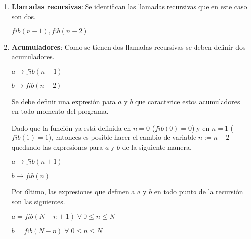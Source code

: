 \documentclass[hidelinks]{article}
\begin{document}
\begin{enumerate}
	\item \textbf{Llamadas recursivas}: Se identifican las llamadas recursivas que en este
	      caso son dos.\par
	      $fib(n - 1), fib(n - 2)$\par
	\item \textbf{Acumuladores}: Como se tienen dos llamadas recursivas se deben definir
	      dos acumuladores.\par
	      $a \rightarrow fib(n - 1)$\par
	      $b \rightarrow fib(n - 2)$\par

	      Se debe definir una expresión para $a$ y $b$ que caracterice estos acumuladores
	      en todo momento del programa.\par
	      Dado que la función ya está definida en $n = 0$ ($fib(0) = 0$) y en $n = 1$
	      ($fib(1) = 1$), entonces es posible hacer el cambio de variable $n := n + 2$
	      quedando las expresiones para $a$ y $b$ de la siguiente manera.\par
	      $a \rightarrow fib(n + 1)$\par
	      $b \rightarrow fib(n)$\par
	      Por último, las expresiones que definen a $a$ y $b$ en todo punto de la
	      recursión son las siguientes.\par
	      $a = fib(N - n + 1) \; \forall \; 0 \leq n \leq N$\par
	      $b = fib(N - n) \; \forall \; 0 \leq n \leq N$\par


\end{enumerate}
\end{document}
